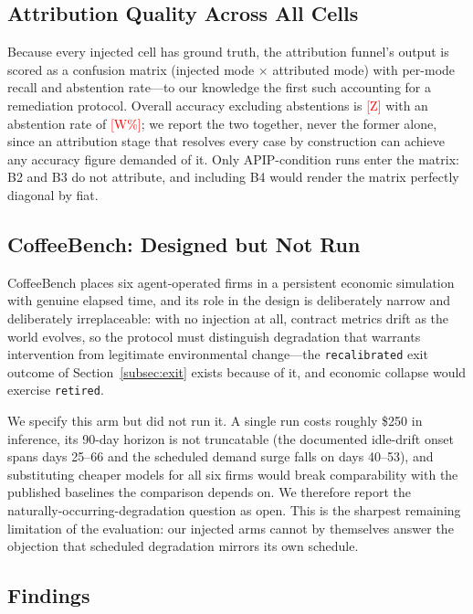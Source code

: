 \documentclass[conference]{IEEEtran}
\newcommand{\pending}[1]{\textcolor{red}{[#1]}}
\newcommand{\attrAccuracy}{\pending{Z}}          %
\newcommand{\attrAbstention}{\pending{W\%}}      %
\begin{document}
\subsection{Attribution Quality Across All Cells}
\label{subsec:eval-attribution}

Because every injected cell has ground truth, the attribution funnel's output
is scored as a confusion matrix (injected mode $\times$ attributed mode) with
per-mode recall and abstention rate---to our knowledge the first such
accounting for a remediation protocol. Overall accuracy excluding abstentions
is \attrAccuracy{} with an abstention rate of \attrAbstention{}; we report the
two together, never the former alone, since an attribution stage that resolves
every case by construction can achieve any accuracy figure demanded of it.
Only APIP-condition runs enter the matrix: B2 and B3 do not attribute, and
including B4 would render the matrix perfectly diagonal by fiat.

\subsection{CoffeeBench: Designed but Not Run}
\label{subsec:eval-coffee}

CoffeeBench places six agent-operated firms in a persistent economic simulation
with genuine elapsed time, and its role in the design is deliberately narrow
and deliberately irreplaceable: with no injection at all, contract metrics
drift as the world evolves, so the protocol must distinguish degradation that
warrants intervention from legitimate environmental change---the
\texttt{recalibrated} exit outcome of Section~\ref{subsec:exit} exists
because of it, and economic collapse would exercise \texttt{retired}.

We specify this arm but did not run it. A single run costs roughly \$250 in
inference, its 90-day horizon is not truncatable (the documented idle-drift
onset spans days 25--66 and the scheduled demand surge falls on days 40--53),
and substituting cheaper models for all six firms would break comparability
with the published baselines the comparison depends on. We therefore report
the naturally-occurring-degradation question as open. This is the sharpest
remaining limitation of the evaluation: our injected arms cannot by themselves
answer the objection that scheduled degradation mirrors its own schedule.

\subsection{Findings}
\label{subsec:eval-findings}
\end{document}
